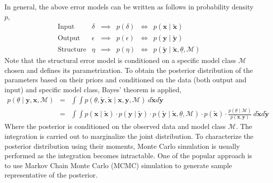 \documentclass[11pt,titlepage]{article}
\begin{document}
In general, the above error models can be written as follows in probability density $p$,
\begin{equation}
\begin{array}{lrcrcr} 
	\text{Input} 	& \delta & \implies & p(\delta)	 	& \iff & p(\mathbf{x} \mid \mathbf{\tilde{x}}) \\ 
	\text{Output} 	& \epsilon & \implies & p(\epsilon) 	& \iff & p(\mathbf{y} \mid \mathbf{\tilde{y}}) \\
	\text{Structure}	& \eta  & \implies & p(\eta) 		& \iff & p(\mathbf{\tilde{y}} \mid \mathbf{\tilde{x}}, \underline{\theta}, \mathcal{M}) 
\end{array}
\nonumber
\end{equation}
Note that the structural error model is conditioned on a specific model class $\mathcal{M}$ chosen and defines its parametrization. 
To obtain the posterior distribution of the parameters based on their priors and conditioned on the data (both output and input) and specific model class, Bayes' theorem is applied,
\begin{equation}
\begin{array}{rcl} 
	p(\underline{\theta} \mid \mathbf{y}, \mathbf{x}, \mathcal{M} )	& = & \int \int p(\underline{\theta}, \mathbf{\tilde{y}}, \mathbf{\tilde{x}} \mid \mathbf{x}, \mathbf{y}, \mathcal{M} ) \: d\mathbf{\tilde{x}} d\mathbf{\tilde{y}} \\ 
		& = & \int \int p(\mathbf{x} \mid \mathbf{\tilde{x}}) \cdot p(\mathbf{y} \mid \mathbf{\tilde{y}}) \cdot p(\mathbf{\tilde{y}} \mid \mathbf{\tilde{x}}, \underline{\theta}, \mathcal{M} ) \cdot p(\mathbf{\tilde{x}}) \cdot \frac{p(\underline{\theta} \mid \mathcal{M})}{p(\mathbf{x}, \mathbf{y})} \: d\mathbf{\tilde{x}} d\mathbf{\tilde{y}}
\end{array}
\nonumber
\end{equation}
Where the posterior is conditioned on the observed data and model class $\mathcal{M}$. 
The integration is carried out to marginalize the joint distribution. 
To characterize the posterior distribution using their moments, Monte Carlo simulation is usually performed as the integration becomes intractable. 
One of the popular approach is to use Markov Chain Monte Carlo (MCMC) simulation to generate sample representative of the posterior.
\end{document}
